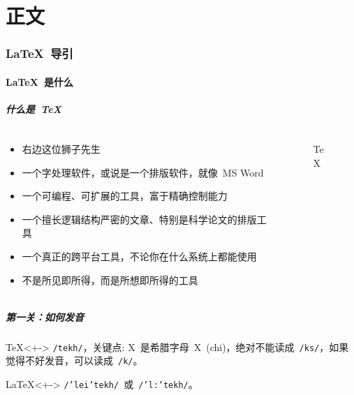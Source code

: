 \part<presentation>{正文}

\section{\LaTeX~导引}

\subsection{\LaTeX~是什么}

\begin{frame}
	\frametitle{什么是~\TeX}
	\begin{columns}[t]
	    \begin{column}{8cm}
		\begin{itemize}
		    \item<+-> 右边这位狮子先生
		    \item<+-> 一个字处理软件，或说是一个\alert<+->{排版软件}，就像~MS Word
		    \item<+-> 一个\alert<+->{可编程}、可扩展的工具，富于\alert<+->{精确控制}能力
		    \item<+-> 一个擅长逻辑结构严密的文章、特别是\alert<+->{科学论文}的排版工具
		    \item<+-> 一个真正的跨平台工具，不论你在什么系统上都能使用
		    \item<+-> 不是所\alert<+->{见}即所得，而是所\alert<+->{想}即所得的工具
		\end{itemize}
	    \end{column}
	    \begin{column}{2cm}
		\begin{figure}[htb]
		    \begin{center}
		    \end{center}
		    \caption{\TeX}
		    \label{fig:tex}
		\end{figure}
	    \end{column}
	\end{columns}
\end{frame}

\begin{frame}
    \frametitle{第一关：如何发音}
    \begin{block}{\TeX}<+->
	\texttt{/tekh/}，关键点: X~是希腊字母~\textrm{X}~(chi)，\alert<+->{绝对不能}读成~\texttt{/ks/}，如果觉得不好发音，可以读成~\texttt{/k/}。
    \end{block}
    \begin{block}{\LaTeX}<+->
	\texttt{/'lei'tekh/}~或~\texttt{/'l\textscripta:'tekh/}。
    \end{block}
\end{frame}

